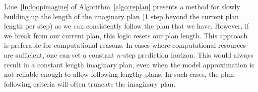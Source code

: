 \documentclass[letterpaper]{article} %
\DeclareMathOperator*{\argmax}{arg\,max}
\begin{document}

        Line~\ref{ln:loopimagine} of Algorithm~\ref{algo:replan} presents a method for slowly building up the length of the imaginary plan (1 step beyond the current plan length per step) as we can consistently follow the plan that we have. However, if we break from our current plan, this logic resets our plan length. This approach is preferable for computational reasons. In cases where computational resources are sufficient, one can set a constant $n$-step prediction horizon. This would always result in a constant length imaginary plan, even when the model approximation is not reliable enough to allow following lengthy plans. In such cases, the plan following criteria will often truncate the imaginary plan.  
\end{document}

